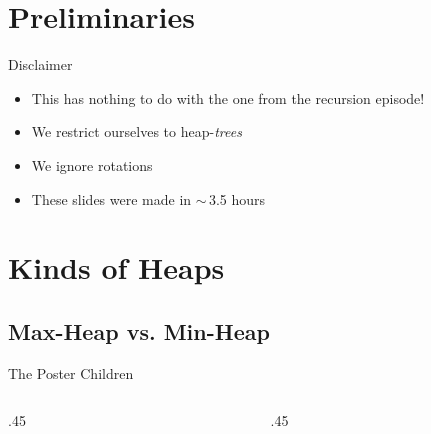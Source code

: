 


\section{Preliminaries}
\begin{frame}{Disclaimer}
    \begin{itemize}[<+(1)->]
        \itemsep12pt
        \item This  has nothing to do with the one from the recursion episode!
        \item We restrict ourselves to heap-\textit{trees}
        \item We ignore rotations
        \item These slides were made in \(\sim\)\,3.5 hours
    \end{itemize}
\end{frame}
\SidebarReset

\section{Kinds of Heaps}
\subsection{Max-Heap vs. Min-Heap}
\savebox{}
\begin{frame}{The Poster Children}
\begin{columns}[c]
    \begin{column}{.45\linewidth}
    \end{column} \begin{column}{.45\linewidth}
    \end{column}
\end{columns}
\end{frame}

